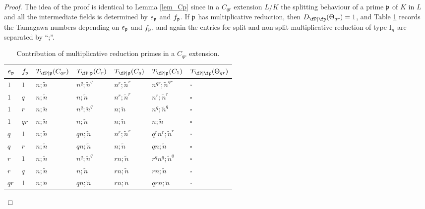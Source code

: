 \begin{proof}
    The idea of the proof is identical to Lemma \ref{lem_Cp} since in a $C_{qr}$ extension $L/K$ the splitting behaviour of a prime $\mathfrak{p}$ of $K$ in $L$ and all the intermediate fields is determined by $e_{\mathfrak{p}}$ and $f_{\mathfrak{p}}$. If $\mathfrak{p}$ has multiplicative reduction, then $\Dp(\Theta_{qr})=1$, and Table \ref{table_Cpq} records the Tamagawa numbers depending on $e_{\mathfrak{p}}$ and $f_{\mathfrak{p}}$, and again the entries for split and non-split multiplicative reduction of type $\mathrm{I}_n$ are separated by ``;''.

    \begin{table}[!ht]
        \centering
        \begin{tabular}{|l|l|l|l|l|l|l|}
        \hline
        $e_{\mathfrak{p}}$ & $f_{\mathfrak{p}}$  & $T_{\fP\mid \pp}(C_{qr})$ & $T_{\fP\mid \pp}(C_r)$ & $T_{\fP\mid \pp}(C_q)$ & $T_{\fP\mid \pp}(C_1)$ & $\Tp(\Theta_{qr})$ \\ \hline
        $1$ & $1$ & $n;\tilde{n}$ & $n^q;\tilde{n}^q$ & $n^r;\tilde{n}^r$ & $n^{qr};\tilde{n}^{qr}$ & $\square$ \\ \hline
        $1$ & $q$ & $n;\tilde{n}$ & $n;\tilde{n}$ & $n^r;\tilde{n}^r$ & $n^r;\tilde{n}^r$ & $\square$ \\ \hline
        $1$ & $r$ & $n;\tilde{n}$ & $n^q;\tilde{n}^q$ & $n;\tilde{n}$ & $n^q;\tilde{n}^q$ & $\square$ \\ \hline
        $1$ & $qr$ & $n;\tilde{n}$ & $n;\tilde{n}$ & $n;\tilde{n}$ & $n;\tilde{n}$ & $\square$ \\ \hline
        $q$ & $1$ & $n;\tilde{n}$ & $qn;\tilde{n}$ & $n^r;\tilde{n}^r$ & $q^rn^r;\tilde{n}^r$ & $\square$ \\ \hline
        $q$ & $r$ & $n;\tilde{n}$ & $qn;\tilde{n}$ & $n;\tilde{n}$ & $qn;\tilde{n}$ & $\square$ \\ \hline
        $r$ & $1$ & $n;\tilde{n}$ & $n^q;\tilde{n}^q$ & $rn;\tilde{n}$ & $r^qn^q;\tilde{n}^q$ & $\square$ \\ \hline
        $r$ & $q$ & $n;\tilde{n}$ & $n;\tilde{n}$ & $rn;\tilde{n}$ & $rn;\tilde{n}$ & $\square$ \\ \hline
        $qr$ & $1$ & $n;\tilde{n}$ & $qn;\tilde{n}$ & $rn;\tilde{n}$ & $qrn;\tilde{n}$ & $\square$ \\ \hline
        \end{tabular}
        \caption{Contribution of multiplicative reduction primes in a $C_{qr}$ extension.}
        \label{table_Cpq}
    \end{table}


\end{proof}

